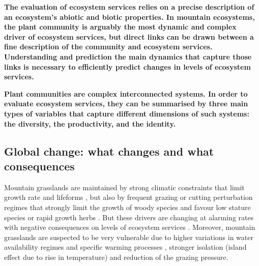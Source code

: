 
%




\textbf{The evaluation of ecosystem services relies on a precise description of an ecosystem's abiotic and biotic properties. In mountain ecosystems, the plant community is arguably the most dynamic and complex driver of ecosystem services, but direct links can be drawn between a fine description of the community and ecosystem services. Understanding and prediction the main dynamics that capture those links is necessary to efficiently predict changes in levels of ecosystem services.}

\textbf{Plant communities are complex interconnected systems. In order to evaluate ecosystem services, they can be summarised by three main types of variables that capture different dimensions of such systems: the diversity, the productivity, and the identity. %
}



\subsection{Global change: what changes and what consequences}

Mountain grasslands are maintained by strong climatic constraints that limit growth rate and lifeforms  \parencite{koorner_alpine_2003}, but also by frequent grazing or cutting perturbation regimes that strongly limit the growth of woody species and favour low stature species or rapid growth herbs \parencite{diaz_plant_2007}. But these drivers are changing at alarming rates with negative consequences on levels of ecosystem services \parencite{schroter_ecosystem_2005}. Moreover, mountain grasslands are suspected to be very vulnerable \parencite{schroter_ecosystem_2005, engler_21st_2011} due to higher variations in water availability regimes and specific warming processes \parencite{mountain_research_initiative_edw_working_group_elevation-dependent_2015}, stronger isolation (island effect due to rise in temperature) and reduction of the grazing pressure.

